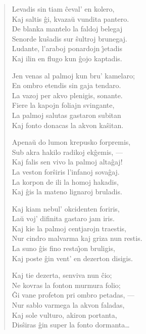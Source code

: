 \begin{verse}
                  \vin   Levadis sin tiam \^ceval' en kolero,\\
                  Kaj saltis \^gi, kvaza\u u vundita pantero.\\
                  De blanka mantelo la faldoj belegaj\\
                  Senorde ku\^sadis sur \^sultroj brunegaj.\\
                  Ludante, l'araboj ponardojn \^{\j}etadis\\
                  Kaj ilin en flugo kun \^gojo kaptadis.

                  \vin   Jen venas al palmoj kun bru' kamelaro;\\
                  En ombro etendis sin gaja tendaro.\\
                  La vazoj per akvo plenigis, sonante.\\
                  Fiere la kapojn foliajn svingante,\\
                  La palmoj salutas gastaron subitan\\
                  Kaj fonto donacas la akvon ka\^sitan.

                  \vin   Apena\u u do lumon krepusko forpremis,\\
                  Sub akra hakilo radikoj ek\^gemis, ---\\
                  Kaj falis sen vivo la palmoj alta\^gaj!\\
                  La veston for\^siris l'infanoj sova\^gaj.\\
                  La korpon de ili la homoj hakadis,\\
                  Kaj \^gis la mateno lignaroj bruladis.

                  \vin   Kaj kiam nebul' okcidenten foriris,\\
                  La\u u voj' difinita gastaro jam iris.\\
                  Kaj kie la palmoj centjarojn traestis,\\
                  Nur cindro malvarma kaj griza nun restis.\\
                  La suno \^gis fino resta\^{\j}on bruligis,\\
                  Kaj poste \^gin vent' en dezerton disigis.

                  \vin Kaj tie dezerta, senviva nun \^cio;\\
                  Ne kovras la fonton murmura folio;\\
                  \^Gi vane profeton pri ombro petadas, ---\\
                  Nur sablo varmega la akvon faladas,\\
                  Kaj sole vulturo, akiron portanta,\\
                  Dis\^siras \^gin super la fonto dormanta\dots

\end{verse}

\smallrule{}

